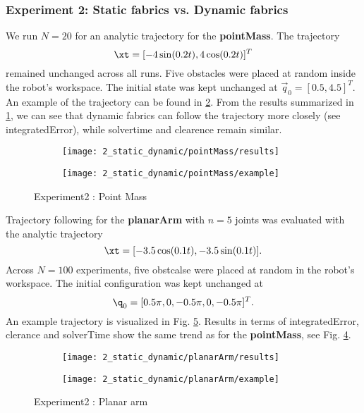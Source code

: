 \subsubsection{Experiment 2: Static fabrics vs. Dynamic fabrics}%
\label{app:sub:experiment_2_static_fabrics_vs_dynamic_fabrics}

We run $N=20$ for an analytic trajectory for the \textbf{pointMass}. The trajectory
\[
  \xt = [-4\sin(0.2t), 4\cos(0.2t)]^T
\]
remained unchanged across all runs. Five obstacles were placed at random inside the
robot's workspace. The initial state was kept unchanged at $\vec{q}_0 = [0.5, 4.5]^T$.
An example of the trajectory can be found in \ref{subfig:experiment2_pointMass_example}.
From the results summarized in \ref{subfig:experiment2_pointMass_res}, we can see that
dynamic fabrics can follow the trajectory more closely (see integratedError), while
solvertime and clearence remain similar.

\begin{figure}[h]
  \centering
  \begin{subfigure}{0.5\linewidth}
    \centering
    \texttt{[image: 2\_static\_dynamic/pointMass/results]}
    \caption{}
    \label{subfig:experiment2_pointMass_res}
  \end{subfigure}%
  \begin{subfigure}{0.5\linewidth}
    \centering
    \texttt{[image: 2\_static\_dynamic/pointMass/example]}
    \caption{}
    \label{subfig:experiment2_pointMass_example}
  \end{subfigure}
  \caption{Experiment2 : Point Mass}%
  \label{fig:experiment2_pointMass}
\end{figure}

Trajectory following for the \textbf{planarArm} with $n=5$ joints
was evaluated with the analytic trajectory
\[
  \xt = [-3.5\cos(0.1t), -3.5\sin(0.1t)].
\]
Across $N=100$ experiments, five obstcalse were placed at random in the robot's workspace.
The initial configuration was kept unchanged at 
\[
  \q_0 = [0.5\pi, 0, -0.5\pi, 0, -0.5\pi]^T.
\]
An example trajectory is visualized in Fig. \ref{subfig:experiment2_planarArm_example}.
Results in terms of integratedError, clerance and solverTime show the same trend as for
the \textbf{pointMass}, see Fig. \ref{subfig:experiment2_planarArm_res}. 

\begin{figure}[h]
  \centering
  \begin{subfigure}{0.5\linewidth}
    \centering
    \texttt{[image: 2\_static\_dynamic/planarArm/results]}
    \caption{}
    \label{subfig:experiment2_planarArm_res}
  \end{subfigure}%
  \begin{subfigure}{0.5\linewidth}
    \centering
    \texttt{[image: 2\_static\_dynamic/planarArm/example]}
    \caption{}
    \label{subfig:experiment2_planarArm_example}
  \end{subfigure}
  \caption{Experiment2 : Planar arm}%
  \label{fig:experiment2_planarArm}
\end{figure}

